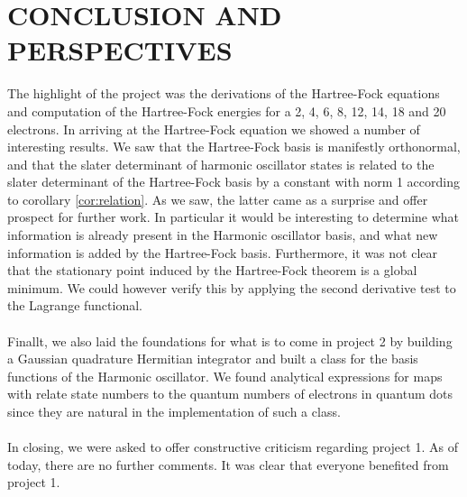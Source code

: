 \documentclass[11pt,english,a4paper]{article}
\begin{document}
\section*{\uppercase{Conclusion and perspectives}}
The highlight of the project was the derivations of the Hartree-Fock equations and computation of the Hartree-Fock energies for a 2, 4, 6, 8, 12, 14, 18 and 20 electrons. In arriving at the Hartree-Fock equation we showed a number of interesting results. We saw that the Hartree-Fock basis is manifestly orthonormal, and that the slater determinant of harmonic oscillator states is related to the slater determinant of the Hartree-Fock basis by a constant with norm 1 according to corollary \ref{cor:relation}. As we saw, the latter came as a surprise and offer prospect for further work. In particular it would be interesting to determine what information is already present in the Harmonic oscillator basis, and what new information is added by the Hartree-Fock basis. Furthermore, it was not clear that the stationary point induced by the Hartree-Fock theorem is a global minimum. We could however verify this by applying the second derivative test to the Lagrange functional.\\
\\
Finallt, we also laid the foundations for what is to come in project 2 by building a Gaussian quadrature Hermitian integrator and built a class for the basis functions of the Harmonic oscillator. We found analytical expressions for maps with relate state numbers to the quantum numbers of electrons in quantum dots since they are natural in the implementation of such a class.\\
\\
In closing, we were asked to offer constructive criticism regarding project 1. As of today, there are no further comments. It was clear that everyone benefited from project 1.
\end{document}

